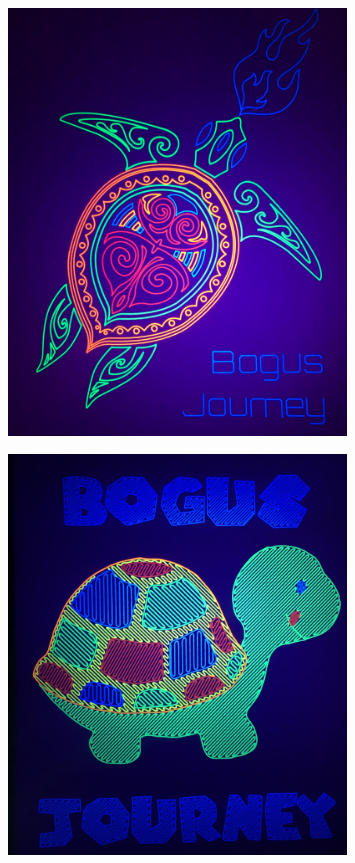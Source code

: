 \documentclass[12pt]{book}
\begin{document}
\begin{figure}
    \centering
    \includegraphics[width=0.8\textwidth]{figures/turtle_pics/poster1.jpg}
\end{figure}

\begin{figure}
    \centering
    \includegraphics[width=0.8\textwidth]{figures/turtle_pics/poster2.jpg}
\end{figure}
\end{document}
